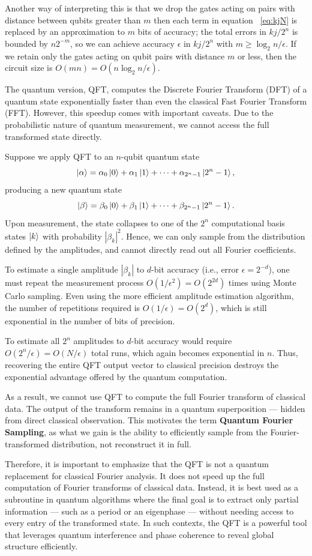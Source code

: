 Another way of interpreting this is that we drop the gates acting on pairs with distance between qubits greater than $m$ then each term in equation ~\eqref{eq:kjN} is replaced by an approximation to $m$ bits of accuracy; the total errors in $kj/2^n$ is bounded by $n2^{-m}$, so we can achieve accuracy $\epsilon$ in $kj/2^n$ with $m\geq \log_2n/\epsilon$. If we retain only the gates acting on qubit pairs with distance $m$ or less, then the circuit size is $O(mn)=O(n\log_2n/\epsilon)$.
\begin{note}
The quantum version, QFT, computes the Discrete Fourier Transform (DFT) of a quantum state exponentially faster than even the classical Fast Fourier Transform (FFT). However, this speedup comes with important caveats. Due to the probabilistic nature of quantum measurement, we cannot access the full transformed state directly.

Suppose we apply QFT to an $n$-qubit quantum state
\[
\ket{\alpha} = \alpha_0\ket{0} + \alpha_1\ket{1} + \dots + \alpha_{2^n - 1}\ket{2^n - 1},
\]
producing a new quantum state
\[
\ket{\beta} = \beta_0\ket{0} + \beta_1\ket{1} + \dots + \beta_{2^n - 1}\ket{2^n - 1}.
\]
Upon measurement, the state collapses to one of the $2^n$ computational basis states $\ket{k}$ with probability $|\beta_k|^2$. Hence, we can only sample from the distribution defined by the amplitudes, and cannot directly read out all Fourier coefficients.

To estimate a single amplitude $|\beta_k|$ to $d$-bit accuracy (i.e., error $\epsilon = 2^{-d}$), one must repeat the measurement process $O(1/\epsilon^2) = O(2^{2d})$ times using Monte Carlo sampling. Even using the more efficient amplitude estimation algorithm, the number of repetitions required is $O(1/\epsilon) = O(2^d)$, which is still exponential in the number of bits of precision.

To estimate all $2^n$ amplitudes to $d$-bit accuracy would require $O(2^n/\epsilon) = O(N/\epsilon)$ total runs, which again becomes exponential in $n$. Thus, recovering the entire QFT output vector to classical precision destroys the exponential advantage offered by the quantum computation.

As a result, we cannot use QFT to compute the full Fourier transform of classical data. The output of the transform remains in a quantum superposition — hidden from direct classical observation. This motivates the term \textbf{Quantum Fourier Sampling}, as what we gain is the ability to efficiently sample from the Fourier-transformed distribution, not reconstruct it in full.

Therefore, it is important to emphasize that the QFT is not a quantum replacement for classical Fourier analysis. It does not speed up the full computation of Fourier transforms of classical data. Instead, it is best used as a subroutine in quantum algorithms where the final goal is to extract only partial information — such as a period or an eigenphase — without needing access to every entry of the transformed state. In such contexts, the QFT is a powerful tool that leverages quantum interference and phase coherence to reveal global structure efficiently.    
\end{note}


